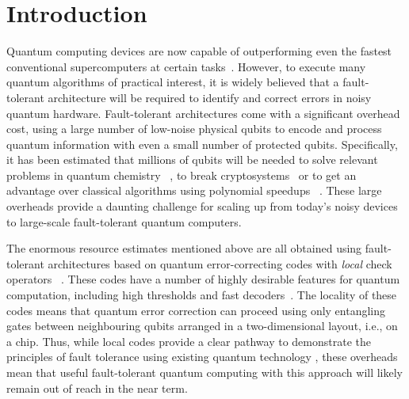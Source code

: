 \documentclass[reprint,
superscriptaddress,
 amsmath,amssymb,
 aps, longbibliography
]{revtex4-1}
\begin{document}
\section{Introduction}

Quantum computing devices are now capable of outperforming even the fastest conventional supercomputers at certain tasks~\cite{arute2019quantum}.  However, to execute many quantum algorithms of practical interest, it is widely believed that a fault-tolerant architecture will be required to identify and correct errors in noisy quantum hardware.  Fault-tolerant architectures come with a significant overhead cost, using a large number of low-noise physical qubits to encode and process quantum information with even a small number of protected qubits.
Specifically, it has been estimated that millions of qubits will be needed to solve relevant problems in quantum chemistry~\cite{vonBurg2021,Lee2020,Kim21}%
, to break cryptosystems~\cite{Fowler12,Gidney21} or to get an advantage over classical algorithms using polynomial speedups~\cite{Campbell19,Sanders2020}%
. These large overheads provide a daunting challenge for scaling up from today's noisy devices to large-scale fault-tolerant quantum computers.

The enormous resource estimates mentioned above are all obtained using fault-tolerant architectures based on quantum error-correcting codes with \emph{local} check operators~\cite{Dennis02,Bombin06,Bacon06,BonillaAtaides21}%
. These codes have a number of highly desirable features for quantum computation, including high thresholds and fast decoders~\cite{Raussendorf07,Fowler12}.  The locality of these codes means that quantum error correction can proceed using only entangling gates between neighbouring qubits arranged in a two-dimensional layout, i.e., on a chip. Thus, while local codes provide a clear pathway to demonstrate the principles of fault tolerance using existing quantum technology%
, these overheads mean that useful fault-tolerant quantum computing with this approach will likely remain out of reach in the near term.
\end{document}

